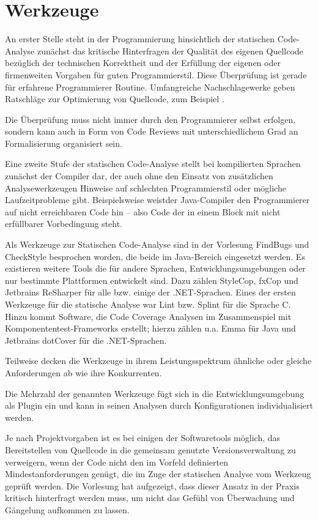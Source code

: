 \section{Werkzeuge}

An erster Stelle steht in der Programmierung hinsichtlich der statischen Code-Analyse zunächst das kritische Hinterfragen der Qualität des eigenen Quellcode bezüglich der technischen Korrektheit und der  Erfüllung der eigenen oder firmenweiten Vorgaben für guten Programmierstil. Diese Überprüfung ist gerade für erfahrene Programmierer Routine. Umfangreiche Nachschlagewerke geben Ratschläge zur Optimierung von Quellcode, zum Beispiel \cite{}.

Die Überprüfung muss nicht immer durch den Programmierer selbst erfolgen, sondern kann auch in Form von Code Reviews mit unterschiedlichem Grad an Formalisierung organisiert sein. 

Eine zweite Stufe der statischen Code-Analyse stellt bei kompilierten Sprachen zunächst der Compiler dar, der auch ohne den Einsatz von zusätzlichen Analysewerkzeugen Hinweise auf schlechten Programmierstil oder mögliche Laufzeitprobleme gibt. Beispielsweise weistder Java-Compiler den Programmierer auf nicht erreichbaren Code hin -- also Code der in einem Block mit nicht erfüllbarer Vorbedingung steht.


Als Werkzeuge zur Statischen Code-Analyse sind in der Vorlesung FindBugs und CheckStyle besprochen worden, die beide im Java-Bereich eingesetzt werden. Es existieren weitere Tools die für andere Sprachen, Entwicklungsumgebungen oder nur bestimmte Plattformen entwickelt sind. Dazu zählen 	StyleCop, fxCop und Jetbrains ReSharper für alle bzw. einige der .NET-Sprachen. Eines der ersten Werkzeuge für die statische Analyse war Lint bzw. Splint für die Sprache C. Hinzu kommt Software, die  Code Coverage Analysen im Zusammenspiel mit Komponententest-Frameworks erstellt; hierzu zählen u.a. Emma für Java und Jetbrains dotCover für die .NET-Sprachen.

Teilweise decken die Werkzeuge in ihrem Leistungsspektrum ähnliche oder gleiche Anforderungen ab wie ihre Konkurrenten.

Die Mehrzahl der genannten Werkzeuge fügt sich in die Entwicklungsumgebung als Plugin ein und kann in seinen Analysen durch Konfigurationen individualisiert werden.

Je nach Projektvorgaben ist es bei einigen der Softwaretools möglich, das Bereitstellen von Quellcode in die gemeinsam genutzte Versionsverwaltung zu verweigern, wenn der Code nicht den im Vorfeld definierten Mindestanforderungen genügt, die im Zuge der statischen Analyse vom Werkzeug geprüft werden. Die Vorlesung hat aufgezeigt, dass dieser Ansatz in der Praxis kritisch hinterfragt werden muss, um nicht das Gefühl von Überwachung und Gängelung aufkommen zu lassen.